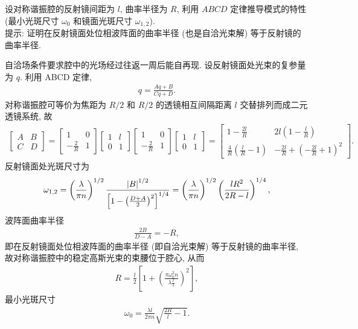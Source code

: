 \documentclass{note}
\begin{document}
\begin{exe}
    设对称谐振腔的反射镜间距为 $l$, 曲率半径为 $R$, 利用 $ABCD$ 定律推导模式的特性 (最小光斑尺寸 $\omega_0$ 和镜面光斑尺寸 $\omega_{1,2}$).\\
    提示: 证明在反射镜面处位相波阵面的曲率半径 (也是自洽光束解) 等于反射镜的曲率半径.
\end{exe}
\begin{sol}
    自洽场条件要求腔中的光场经过往返一周后能自再现. 设反射镜面处光束的复参量为 $q$. 利用 ABCD 定律,
    \begin{align}
        q=\frac{Aq+B}{Cq+D}.
    \end{align}
    对称谐振腔可等价为焦距为 $R/2$ 和 $R/2$ 的透镜相互间隔距离 $l$ 交替排列而成二元透镜系统, 故
    \begin{align}
        \begin{bmatrix}
            A&B\\
            C&D
        \end{bmatrix}=\begin{bmatrix}
            1&0\\
            -\frac{2}{R}&1
        \end{bmatrix}\begin{bmatrix}
            1&l\\
            0&1
        \end{bmatrix}\begin{bmatrix}
            1&0\\
            -\frac{2}{R}&1
        \end{bmatrix}\begin{bmatrix}
            1&l\\
            0&1
        \end{bmatrix}=\begin{bmatrix}
            1-\frac{2l}{R}&2l\left(1-\frac{l}{R}\right)\\
            \frac{4}{R}\left(\frac{l}{R}-1\right)&-\frac{2l}{R}+\left(-\frac{2l}{R}+1\right)^2
        \end{bmatrix}.
    \end{align}
    反射镜面处光斑尺寸为
    \begin{align}
        \omega_{1,2}=\left(\frac{\lambda}{\pi n}\right)^{1/2}\frac{\left\lvert B\right\rvert^{1/2}}{\left[1-\left(\frac{D+A}{2}\right)^2\right]^{1/4}}=\left(\frac{\lambda}{\pi n}\right)^{1/2}\left(\frac{lR^2}{2R-l}\right)^{1/4},
    \end{align}
    波阵面曲率半径
    \begin{align}
        \frac{2B}{D-A}=-R,
    \end{align}
    即在反射镜面处位相波阵面的曲率半径 (即自洽光束解) 等于反射镜的曲率半径, 故对称谐振腔中的稳定高斯光束的束腰位于腔心, 从而
    \begin{align}
        R=\frac{l}{2}\left[1+\left(\frac{\pi\omega_0^2n}{\lambda\frac{l}{2}}\right)^2\right],
    \end{align}
    最小光斑尺寸
    \begin{align}
        \omega_0=\frac{\lambda l}{2\pi n}\sqrt{\frac{2R}{l}-1}.
    \end{align}
\end{sol}
\end{document}
